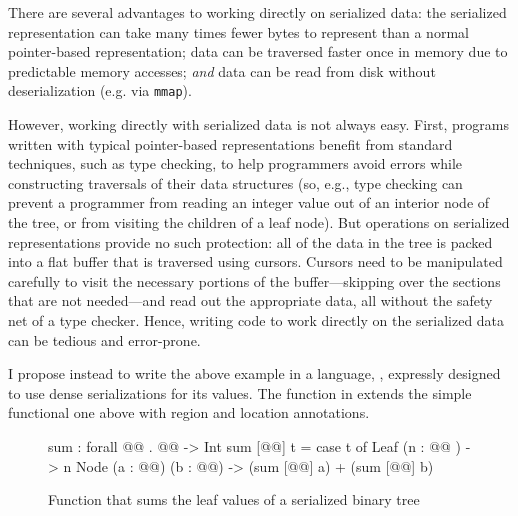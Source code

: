 There are several advantages to working directly on serialized data: the
serialized representation can take many times fewer bytes to represent than
a normal pointer-based representation; data can be traversed faster once in
memory due to predictable memory accesses; \emph{and} data can be read from
disk without deserialization (e.g. via \texttt{mmap}).
%

However, working directly with serialized data is not always easy. First,
programs written with typical pointer-based representations benefit from
standard techniques, such as type checking, to help programmers avoid errors
while constructing traversals of their data structures (so, e.g., type
checking can prevent a programmer from reading an integer value out of an
interior node of the tree, or from visiting the children of a leaf node). But
operations on serialized representations provide no such protection: all of the
data in the tree is packed into a flat buffer that is traversed using cursors.
Cursors need to be manipulated carefully to visit
the necessary portions of the buffer---skipping over the sections that are not
needed---and read out the appropriate data, all without the safety net of a
type checker. Hence, writing code to work directly on the serialized data can
be tedious and error-prone.

I propose instead to write the above example in a language, \emph{\ourcalc},
expressly designed to use dense serializations for its values. The \ourcalc
{} function in  extends the simple functional
one above with region and location annotations.

\begin{figure}
\begin{code}
sum : forall @@ . @@ -> Int
sum [@@] t = case t of
              Leaf (n : @@ ) -> n
              Node (a : @@) (b : @@)
               -> (sum [@@] a) + (sum [@@] b)
\end{code}
\caption{Function that sums the leaf values of a serialized binary tree}
\label{fig:gibbon_sumtree}
\end{figure}


